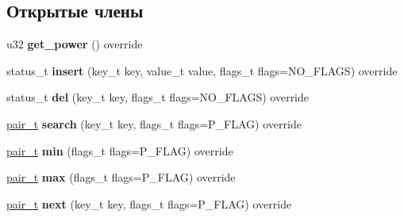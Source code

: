 \subsection*{Открытые члены}
\begin{DoxyCompactItemize}
\item 
\mbox{\label{class_s_p_u_1_1_base_structure_a38bc4a650b064ee7cf2b54b03f8dfebb}} 
u32 {\bfseries get\+\_\+power} () override
\item 
\mbox{\label{class_s_p_u_1_1_base_structure_a34c1db5f750ad9a683426fe57516187a}} 
status\+\_\+t {\bfseries insert} (key\+\_\+t key, value\+\_\+t value, flags\+\_\+t flags=N\+O\+\_\+\+F\+L\+A\+GS) override
\item 
\mbox{\label{class_s_p_u_1_1_base_structure_a94c3b4f7e1dd49ebe715385373a06708}} 
status\+\_\+t {\bfseries del} (key\+\_\+t key, flags\+\_\+t flags=N\+O\+\_\+\+F\+L\+A\+GS) override
\item 
\mbox{\label{class_s_p_u_1_1_base_structure_a127f43b3ea999118e08ca797b42ac9ac}} 
\hyperlink{struct_s_p_u_1_1pair__containter}{pair\+\_\+t} {\bfseries search} (key\+\_\+t key, flags\+\_\+t flags=P\+\_\+\+F\+L\+AG) override
\item 
\mbox{\label{class_s_p_u_1_1_base_structure_a6c8e68accd0546286b2d783a1253e6c3}} 
\hyperlink{struct_s_p_u_1_1pair__containter}{pair\+\_\+t} {\bfseries min} (flags\+\_\+t flags=P\+\_\+\+F\+L\+AG) override
\item 
\mbox{\label{class_s_p_u_1_1_base_structure_a8dd831f527837a81aead1c14e60f8b85}} 
\hyperlink{struct_s_p_u_1_1pair__containter}{pair\+\_\+t} {\bfseries max} (flags\+\_\+t flags=P\+\_\+\+F\+L\+AG) override
\item 
\mbox{\label{class_s_p_u_1_1_base_structure_a6a29d3ff930d608adebcd787fa60f16c}} 
\hyperlink{struct_s_p_u_1_1pair__containter}{pair\+\_\+t} {\bfseries next} (key\+\_\+t key, flags\+\_\+t flags=P\+\_\+\+F\+L\+AG) override
\item 
\mbox{\label{class_s_p_u_1_1_base_structure_af79a7465fb42e951e255c8fd2bddbbda}} 

\end{DoxyCompactItemize}
